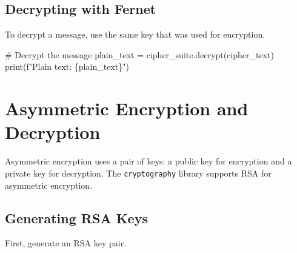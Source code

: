 \documentclass[
  letterpaper,
  DIV=11,
  numbers=noendperiod]{scrreprt}
\newenvironment{Shaded}{\begin{snugshade}}{\end{snugshade}}
\newcommand{\BuiltInTok}[1]{\textcolor[rgb]{0.00,0.23,0.31}{#1}}
\newcommand{\CommentTok}[1]{\textcolor[rgb]{0.37,0.37,0.37}{#1}}
\newcommand{\NormalTok}[1]{\textcolor[rgb]{0.00,0.23,0.31}{#1}}
\newcommand{\OperatorTok}[1]{\textcolor[rgb]{0.37,0.37,0.37}{#1}}
\newcommand{\SpecialCharTok}[1]{\textcolor[rgb]{0.37,0.37,0.37}{#1}}
\newcommand{\SpecialStringTok}[1]{\textcolor[rgb]{0.13,0.47,0.30}{#1}}
\begin{document}
\subsection{Decrypting with Fernet}\label{decrypting-with-fernet}

To decrypt a message, use the same key that was used for encryption.

\begin{Shaded}
\begin{Highlighting}[]
\CommentTok{\# Decrypt the message}
\NormalTok{plain\_text }\OperatorTok{=}\NormalTok{ cipher\_suite.decrypt(cipher\_text)}
\BuiltInTok{print}\NormalTok{(}\SpecialStringTok{f"Plain text: }\SpecialCharTok{\{}\NormalTok{plain\_text}\SpecialCharTok{\}}\SpecialStringTok{"}\NormalTok{)}
\end{Highlighting}
\end{Shaded}

\section{Asymmetric Encryption and
Decryption}\label{asymmetric-encryption-and-decryption}

Asymmetric encryption uses a pair of keys: a public key for encryption
and a private key for decryption. The \texttt{cryptography} library
supports RSA for asymmetric encryption.

\subsection{Generating RSA Keys}\label{generating-rsa-keys}

First, generate an RSA key pair.
\end{document}
